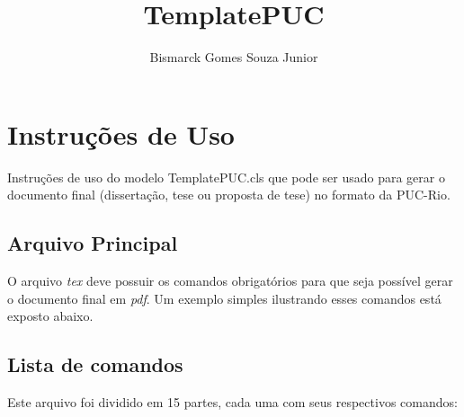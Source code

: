 \documentclass{book}
\begin{document}
  \title{TemplatePUC}
  \author{Bismarck Gomes Souza Junior}
  \maketitle
  \let\cleardoublepage\clearpage

  \chapter*{Instruções de Uso}

  Instruções de uso do modelo TemplatePUC.cls que pode ser usado para gerar o documento final (dissertação, tese ou proposta de tese) no formato da PUC-Rio.

  \section*{Arquivo Principal}

  O arquivo \textit{tex} deve possuir os comandos obrigatórios para que seja possível gerar o documento final em \textit{pdf}. Um exemplo simples ilustrando esses comandos está exposto abaixo.


  

  \section*{Lista de comandos}
  Este arquivo foi dividido em 15 partes, cada uma com seus respectivos comandos:
\end{document}
